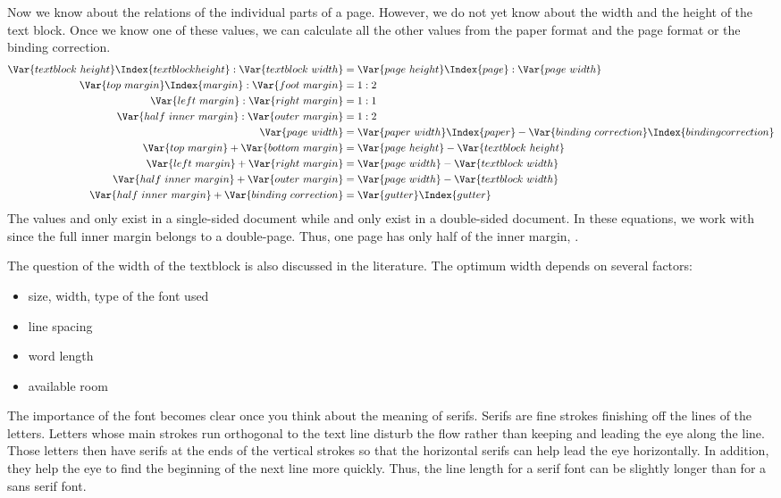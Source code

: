 \begin{Explain}
  Now we know about the relations of the individual parts of a page.
  However, we do not yet know about the width and the height of the
  text block. Once we know one of these values, we can calculate
  all the other values from the paper format and the page format or
  the binding correction.
  \begin{align*}
    \Var{textblock~height} \Index{textblock height} : \Var{textblock~width} &=
    \Var{page~height}\Index{page} : \Var{page~width}\\
    \Var{top~margin}\Index{margin} : \Var{foot~margin} &=
      \text{1} : \text{2} \\
%
    \Var{left~margin} : \Var{right~margin} &=  \text{1} : \text{1} \\
%
    \Var{half~inner~margin} : \Var{outer~margin} &= \text{1} : \text{2} \\
%
   \Var{page~width} &= 
      \Var{paper~width}\Index{paper} - 
      \Var{binding~correction}\Index{binding correction}\\
%
    \Var{top~margin} + \Var{bottom~margin} &=
    \Var{page~height} - \Var{textblock~height} \\
%
    \Var{left~margin} + \Var{right~margin} &=
    \Var{page~width} - \Var{textblock~width} \\
%
    \Var{half~inner~margin} + \Var{outer~margin} &=
    \Var{page~width} - \Var{textblock~width} \\
%
    \Var{half~inner~margin} + \Var{binding~correction} &=
    \Var{gutter}\Index{gutter}
  \end{align*}
  The values  and  only exist in a
  single-sided document while  and
   only exist in a double-sided document.  In these
  equations, we work with  since the full inner
  margin belongs to a double-page. Thus, one page has only half of the
  inner margin, .

  The question of the width of the textblock is also discussed in
  the literature. The optimum width depends on several factors:
  \begin{itemize}
  \item size, width, type of the font used
  \item line spacing
  \item word length
  \item available room
  \end{itemize}
  The importance of the font becomes clear once you think about the
  meaning of serifs. Serifs are fine strokes
  finishing off the lines of the letters. Letters whose main strokes
  run orthogonal to the text line disturb the flow rather than keeping
  and leading the eye along the line. Those letters then have serifs
  at the ends of the vertical strokes so that the horizontal serifs
  can help lead the eye horizontally. In addition, they help the eye
  to find the beginning of the next line more quickly. Thus, the line
  length for a serif font can be slightly longer than for a sans serif
  font.


\end{Explain}
